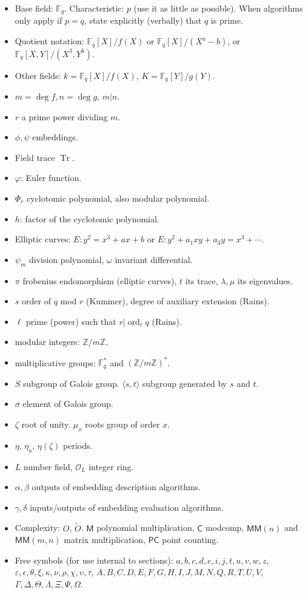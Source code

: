 \documentclass[12pt]{article}
\theoremstyle{plain}
\theoremstyle{definition}
\newcommand{\tildO}{\tilde{O}}
\DeclareMathOperator{\trace}{Tr} %
\DeclareMathOperator{\order}{ord} %
\def\Z{\ensuremath{\mathbb{Z}}}
\def\F{\ensuremath{\mathbb{F}}}
\def\MM{\ensuremath{\mathsf{M}}}
\def\MMM{\ensuremath{\mathsf{MM}}}
\def\MC{\ensuremath{\mathsf{C}}}
\def\PC{\ensuremath{\mathsf{PC}}}
\def\euler{\ensuremath{\varphi}}
\newcounter{algorithm}
\begin{document}
\begin{itemize}
\item Base field: $\F_q$. Characteristic: $p$ (use it as little as
  possible). When algorithms only apply if $p=q$, state explicitly
  (verbally) that $q$ is prime.
\item Quotient notation: $\F_q[X]/f(X)$ or $\F_q[X]/(X^a-b)$, or
  $\F_q[X,Y]/(X^3,Y^6)$.
\item Other fields: $k = \F_q[X]/f(X)$, $K = \F_q[Y]/g(Y)$.
\item $m = \deg f, n=\deg g$, $m|n$.
\item $r$ a prime power dividing $m$.
\item $\phi,\psi$ embeddings.
\item Field trace $\trace$.
\item $\euler$: Euler function.
\item $\Phi_r$ cyclotomic polynomial, also modular polynomial.
\item $h$: factor of the cyclotomic polynomial.
\item Elliptic curves: $E:y^2=x^3+ax+b$ or $E:y^2+a_1xy+a_3y=x^3+\cdots$.
\item $\psi_m$ division polynomial, $\omega$ invariant differential.
\item $\pi$ frobenius endomorphism (elliptic curves), $t$ its trace,
  $\lambda,\mu$ its eigenvalues.
\item $s$ order of $q$ mod $r$ (Kummer), degree of auxiliary extension (Rains).
\item $\ell$ prime (power) such that $r|\order_\ell q$ (Rains).
\item modular integers: $\Z/m\Z$,
\item multiplicative groups: $\F_q^\ast$ and $(\Z/m\Z)^\ast$.
\item $S$ subgroup of Galois group. $\langle s,t \rangle$ subgroup
  generated by $s$ and $t$.
\item $\sigma$ element of Galois group.
\item $\zeta$ root of unity. $\mu_x$ roots group of order $x$.
\item $\eta$, $\eta_a$, $\eta(\zeta)$ periods.
\item $L$ number field, $\mathcal{O}_L$ integer ring.
\item $\alpha,\beta$ outputs of embedding description algorithms.
\item $\gamma,\delta$ inputs/outputs of embedding evaluation algorithms.
\item Complexity: $O$, $\tildO$. $\MM$ polynomial multiplication,
  $\MC$ modcomp, $\MMM(n)$ and $\MMM(m,n)$ matrix multiplication,
  $\PC$ point counting.
\item Free symbols (for use internal to sections):
  $a,b,c,d,e,i,j,t,u,v,w,z$,
  $\varepsilon,\epsilon,\theta,\xi,\kappa,\nu,\rho,\chi,\upsilon,\tau$,
  $A,B,C,D,E,F,G,H,I,J,M,N,Q,R,T,U,V$,
  $\Gamma,\Delta,\Theta,\Lambda,\Xi,\Psi,\Omega$.
\end{itemize}
\end{document}
